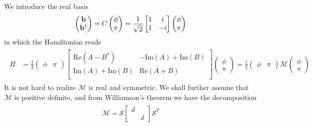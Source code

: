 We introduce the real basis 
\begin{eqnarray}\begin{aligned}
\label{eq:real_basis}
\begin{pmatrix}
{\bf b}\\
{\bf b}^\dagger
\end{pmatrix}
=C\begin{pmatrix}
\phi\\
\pi
\end{pmatrix}
=\frac{1}{\sqrt{2}}\begin{bmatrix}
1 & i \\
1 & -i
\end{bmatrix}\begin{pmatrix}
\phi\\
\pi
\end{pmatrix}
\end{aligned}\end{eqnarray}
in which the Hamiltonian reads
\begin{eqnarray}\begin{aligned}
\hat{H}
&=\frac{1}{2}
\begin{pmatrix}
\phi & \pi
\end{pmatrix}
\begin{bmatrix}
\text{Re}(A-B^*) & -\text{Im}(A)+\text{Im}(B)\\
\text{Im}(A)+\text{Im}(B)& \text{Re}(A+B) \\
\end{bmatrix}
\begin{pmatrix}
\phi\\
\pi
\end{pmatrix}
=\frac{1}{2}
\begin{pmatrix}
\phi & \pi
\end{pmatrix}
\mathcal{M}
\begin{pmatrix}
\phi\\
\pi
\end{pmatrix}
\end{aligned}\end{eqnarray}
It is not hard to realize $\mathcal{M}$ is real and symmetric. We shall further assume that $\mathcal{M}$ is positive definite, and from Williamson's theorem\cite{arnold_mathematical_2010} we have the decomposition
\begin{eqnarray}\begin{aligned}
\mathcal{M}=\mathcal{S}
\begin{bmatrix}
d\\
&d
\end{bmatrix}
\mathcal{S}^T
\end{aligned}\end{eqnarray}
